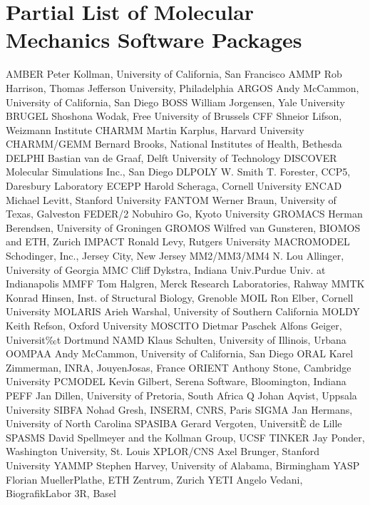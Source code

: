 \documentclass[letterpaper,11pt,english]{sphinxmanual}
\begin{document}
\section{Partial List of Molecular Mechanics Software Packages}
\label{\detokenize{text/references:partial-list-of-molecular-mechanics-software-packages}}
\begin{sphinxVerbatim}[commandchars=\\\{\}]
AMBER          Peter Kollman, University of California, San Francisco
AMMP           Rob Harrison, Thomas Jefferson University, Philadelphia
ARGOS          Andy McCammon, University of California, San Diego
BOSS           William Jorgensen, Yale University
BRUGEL         Shoshona Wodak, Free University of Brussels
CFF            Shneior Lifson, Weizmann Institute
CHARMM         Martin Karplus, Harvard University
CHARMM/GEMM    Bernard Brooks, National Institutes of Health, Bethesda
DELPHI         Bastian van de Graaf, Delft University of Technology
DISCOVER       Molecular Simulations Inc., San Diego
DL\PYGZus{}POLY        W. Smith \PYGZam{} T. Forester, CCP5, Daresbury Laboratory
ECEPP          Harold Scheraga, Cornell University
ENCAD          Michael Levitt, Stanford University
FANTOM         Werner Braun, University of Texas, Galveston
FEDER/2        Nobuhiro Go, Kyoto University
GROMACS        Herman Berendsen, University of Groningen
GROMOS         Wilfred van Gunsteren, BIOMOS and ETH, Zurich
IMPACT         Ronald Levy, Rutgers University
MACROMODEL     Schodinger, Inc., Jersey City, New Jersey
MM2/MM3/MM4    N. Lou Allinger, University of Georgia
MMC            Cliff Dykstra, Indiana Univ.\PYGZhy{}Purdue Univ. at Indianapolis
MMFF           Tom Halgren, Merck Research Laboratories, Rahway
MMTK           Konrad Hinsen, Inst. of Structural Biology, Grenoble
MOIL           Ron Elber, Cornell University
MOLARIS        Arieh Warshal, University of Southern California
MOLDY          Keith Refson, Oxford University
MOSCITO        Dietmar Paschek \PYGZam{} Alfons Geiger, Universit‰t Dortmund
NAMD           Klaus Schulten, University of Illinois, Urbana
OOMPAA         Andy McCammon, University of California, San Diego
ORAL           Karel Zimmerman, INRA, Jouy\PYGZhy{}en\PYGZhy{}Josas, France
ORIENT         Anthony Stone, Cambridge University
PCMODEL        Kevin Gilbert, Serena Software, Bloomington, Indiana
PEFF           Jan Dillen, University of Pretoria, South Africa
Q              Johan Aqvist, Uppsala University
SIBFA          Nohad Gresh, INSERM, CNRS, Paris
SIGMA          Jan Hermans, University of North Carolina
SPASIBA        Gerard Vergoten, UniversitÈ de Lille
SPASMS         David Spellmeyer and the Kollman Group, UCSF
TINKER         Jay Ponder, Washington University, St. Louis
XPLOR/CNS      Axel Brunger, Stanford University
YAMMP          Stephen Harvey, University of Alabama, Birmingham
YASP           Florian Mueller\PYGZhy{}Plathe, ETH Zentrum, Zurich
YETI           Angelo Vedani, Biografik\PYGZhy{}Labor 3R, Basel
\end{sphinxVerbatim}
\end{document}
